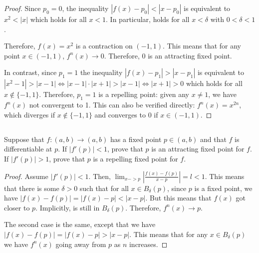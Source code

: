 \begin{proof}
Since $p_0=0$, the inequality $|f(x) - p_0| < |x - p_0|$ is equivalent to $x^2 < |x|$ which holds for all $x < 1$. In particular, holds for all $x < \delta$ with $0 < \delta < 1$.

Therefore, $f(x) = x^2$ is a contraction on $(-1,1)$. This means that for any point $x \in (-1,1)$, $f^n(x) \rightarrow 0$. Therefore, 0 is an attracting fixed point.

\vspace{1em}

In contrast, since $p_1 = 1$ the inequality $|f(x) - p_1| > |x - p_1|$ is equivalent to $|x^2 - 1| > |x-1| \Leftrightarrow |x-1|\cdot|x+1| > |x-1|  \Leftrightarrow |x+1| > 0$ which holds for all $x \notin \{-1,1\}$. Therefore, $p_1=1$ is a repelling point: given any $x \neq 1$, we have $f^n(x)$ not convergent to 1. This can also be verified directly: $f^n(x) = x^{2n}$, which diverges if $x \notin \{-1,1\}$ and converges to 0 if $x \in (-1,1)$. 

\end{proof}


\subsection{} Suppose that $f: (a, b) \rightarrow (a, b)$ has a fixed point $p \in (a, b)$ and that $f$ is differentiable at $p$. If $|f'(p)| < 1$, prove that $p$ is an attracting fixed point for $f$. If $|f'(p)| > 1$, prove that $p$ is a repelling fixed point for $f$.

\begin{proof}
Assume $|f'(p)|<1$. Then, $\lim_{x->p} |\frac{f(x) - f(p)}{x-p}| = l < 1$. This means that there is some $\delta > 0$ such that for all $x \in B_\delta(p)$, since $p$ is a fixed point, we have $|f(x) - f(p)| = |f(x) - p| < |x - p|$. But this means that $f(x)$ got closer to $p$. Implicitly, is still in $B_\delta(p)$. Therefore, $f^n(x) \rightarrow p$.

\vspace{1em}

The second case is the same, except that we have $|f(x) - f(p)| = |f(x) - p| > |x - p|$. This means that for any $x \in B_\delta(p)$ we have $f^n(x)$ going away from $p$ as $n$ increases.

\end{proof}


